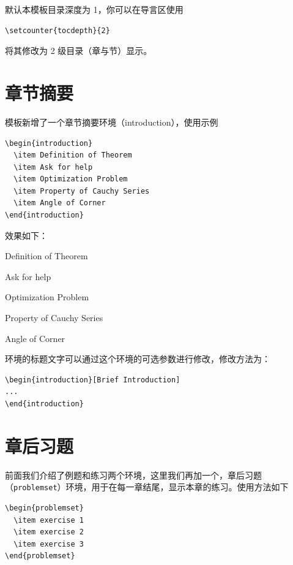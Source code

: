 \documentclass[lang=cn,10pt]{elegantbook}
\begin{document}
默认本模板目录深度为 1，你可以在导言区使用
\begin{lstlisting}
\setcounter{tocdepth}{2}
\end{lstlisting}
将其修改为 2 级目录（章与节）显示。



\section{章节摘要}
模板新增了一个章节摘要环境（introduction），使用示例
\begin{lstlisting}
\begin{introduction}
  \item Definition of Theorem
  \item Ask for help
  \item Optimization Problem
  \item Property of Cauchy Series
  \item Angle of Corner
\end{introduction}
\end{lstlisting}
效果如下：
\begin{introduction}
  \item Definition of Theorem
  \item Ask for help
  \item Optimization Problem
  \item Property of Cauchy Series
  \item Angle of Corner
\end{introduction}

环境的标题文字可以通过这个环境的可选参数进行修改，修改方法为：
\begin{lstlisting}
\begin{introduction}[Brief Introduction]
...
\end{introduction}
\end{lstlisting}



\section{章后习题}
前面我们介绍了例题和练习两个环境，这里我们再加一个，章后习题（\lstinline{problemset}）环境，用于在每一章结尾，显示本章的练习。使用方法如下

\begin{lstlisting}
\begin{problemset}
  \item exercise 1
  \item exercise 2
  \item exercise 3
\end{problemset}
\end{lstlisting}
\end{document}
